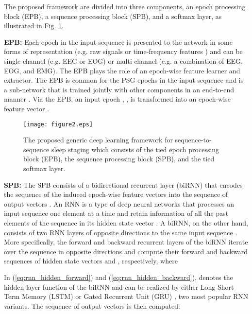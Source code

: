 \documentclass[journal,twoside,web]{ieeecolor}
\begin{document}
The proposed framework are divided into three components, an epoch processing block (EPB), a sequence processing block (SPB), and a softmax layer, as illustrated  in Fig. \ref{fig:endtoend_seqtoseq}. 

{\bf EPB:} Each epoch in the input sequence is presented to the network in some forms of representation (e.g. raw signals \cite{Supratak2017} or time-frequency features \cite{Phan2019a}) and can be single-channel (e.g. EEG or EOG) or multi-channel (e.g. a combination of EEG, EOG, and EMG). The EPB plays the role of an epoch-wise feature learner and extractor. The EPB is common for the PSG epochs in the input sequence and is a sub-network that is trained jointly with other components in an end-to-end manner \cite{Phan2019a}. Via the EPB, an input epoch , , is transformed into an epoch-wise feature vector . 

\begin{figure} [!t]
	\centering
	\texttt{[image: figure2.eps]}
	\vspace{-0.1cm}
	\caption{The proposed generic deep learning framework for sequence-to-sequence sleep staging which consists of the tied epoch processing block (EPB), the sequence processing block (SPB), and the tied softmax layer.} 
	\label{fig:endtoend_seqtoseq}
	\vspace{-0.25cm}
\end{figure}

{\bf SPB:} The SPB consists of a bidirectional recurrent layer (biRNN) that encodes the sequence of the induced epoch-wise feature vectors  into the sequence of output vectors . An RNN is a type of deep neural networks that processes an input sequence one element at a time and retain information of all the past elements of the sequence in its hidden state vector \cite{LeCun2015}. A biRNN, on the other hand, consists of two RNN layers of opposite directions to the same input sequence \cite{Schuster1997}. More specifically, the forward and backward recurrent layers of the biRNN iterate over the sequence  in opposite directions and compute their forward and backward sequences of hidden state vectors  and , respectively, where

In (\ref{eq:rnn_hidden_forward}) and (\ref{eq:rnn_hidden_backward}),   denotes the hidden layer function of the biRNN and can be realized by either Long Short-Term Memory (LSTM) \cite{Hochreiter1997} or Gated Recurrent Unit (GRU) \cite{Cho2014}, two most popular RNN variants. The sequence of output vectors  is then computed:
\end{document}
